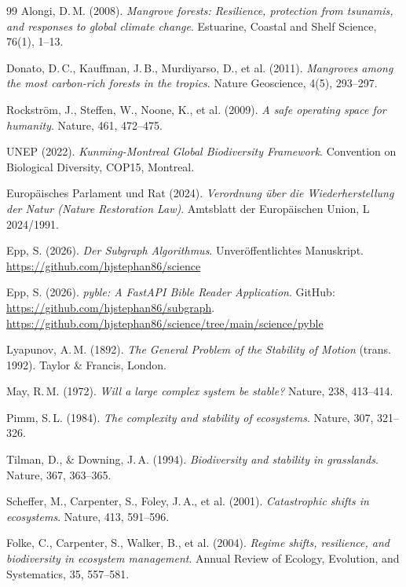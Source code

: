 ﻿\documentclass[a4paper,12pt]{article}
\theoremstyle{definition}
\begin{document}
\begin{thebibliography}{99}
Alongi, D.\,M. (2008).
\textit{Mangrove forests: Resilience, protection from tsunamis, and responses to global climate change}.
Estuarine, Coastal and Shelf Science, 76(1), 1--13.

Donato, D.\,C., Kauffman, J.\,B., Murdiyarso, D., et al. (2011).
\textit{Mangroves among the most carbon-rich forests in the tropics}.
Nature Geoscience, 4(5), 293--297.

Rockström, J., Steffen, W., Noone, K., et al. (2009).
\textit{A safe operating space for humanity}.
Nature, 461, 472--475.

UNEP (2022).
\textit{Kunming-Montreal Global Biodiversity Framework}.
Convention on Biological Diversity, COP15, Montreal.

Europäisches Parlament und Rat (2024).
\textit{Verordnung über die Wiederherstellung der Natur (Nature Restoration Law)}.
Amtsblatt der Europäischen Union, L 2024/1991.

Epp, S. (2026).
\textit{Der Subgraph Algorithmus}.
Unveröffentlichtes Manuskript.
\url{https://github.com/hjstephan86/science}

Epp, S. (2026).
\textit{pyble: A FastAPI Bible Reader Application}.
GitHub: \url{https://github.com/hjstephan86/subgraph}.
\url{https://github.com/hjstephan86/science/tree/main/science/pyble}

Lyapunov, A.\,M. (1892).
\textit{The General Problem of the Stability of Motion} (trans. 1992).
Taylor \& Francis, London.

May, R.\,M. (1972).
\textit{Will a large complex system be stable?}
Nature, 238, 413--414.

Pimm, S.\,L. (1984).
\textit{The complexity and stability of ecosystems}.
Nature, 307, 321--326.

Tilman, D., \& Downing, J.\,A. (1994).
\textit{Biodiversity and stability in grasslands}.
Nature, 367, 363--365.

Scheffer, M., Carpenter, S., Foley, J.\,A., et al. (2001).
\textit{Catastrophic shifts in ecosystems}.
Nature, 413, 591--596.

Folke, C., Carpenter, S., Walker, B., et al. (2004).
\textit{Regime shifts, resilience, and biodiversity in ecosystem management}.
Annual Review of Ecology, Evolution, and Systematics, 35, 557--581.

\end{thebibliography}
\end{document}

